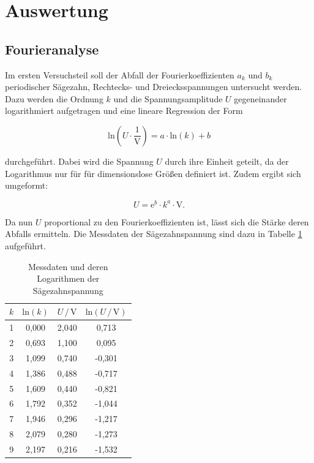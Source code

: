 \section{Auswertung}
\label{sec:Auswertung}

\subsection{Fourieranalyse}

Im ersten Versuchsteil soll der Abfall der Fourierkoeffizienten $a_k$ und $b_k$
periodischer Sägezahn, Rechtecks- und Dreiecksspannungen untersucht werden.
Dazu werden die Ordnung $k$ und die Spannungsamplitude $U$ gegeneinander
logarithmiert aufgetragen und eine lineare Regression der Form

\begin{equation}
    \text{ln} \left(U \cdot \frac{1}{\si{\volt}} \right) = a \cdot \text{ln}(k) + b
\end{equation}

durchgeführt.
Dabei wird die Spannung $U$ durch ihre Einheit geteilt, da der Logarithmus nur für
für dimensionslose Größen definiert ist. Zudem ergibt sich umgeformt:

\begin{equation}
    U = \text{e}^b \cdot k^a \cdot \si{\volt}.
    \label{eqn:Spannung}
\end{equation}

Da nun $U$ proportional zu den Fourierkoeffizienten ist, lässt sich die
Stärke deren Abfalls ermitteln.
Die Messdaten der Sägezahnspannung sind dazu in Tabelle \ref{tab:Messdaten1} aufgeführt. 

\begin{table}[H]
    \centering
    \caption{Messdaten und deren Logarithmen der Sägezahnspannung}
    \label{tab:Messdaten1}
    \begin{tabular}{c c c c}
    \toprule
    $k$ & $\text{ln} (k)$ & $U \,/\, \si{\volt}$ & $\text{ln}(U \,/\, \si{\volt})$ \\
    \midrule
    1 & 0,000 & 2,040 &  0,713 \\
    2 & 0,693 & 1,100 &  0,095 \\
    3 & 1,099 & 0,740 & -0,301 \\
    4 & 1,386 & 0,488 & -0,717 \\
    5 & 1,609 & 0,440 & -0,821 \\
    6 & 1,792 & 0,352 & -1,044 \\
    7 & 1,946 & 0,296 & -1,217 \\
    8 & 2,079 & 0,280 & -1,273 \\
    9 & 2,197 & 0,216 & -1,532 \\
    \bottomrule
    \end{tabular}
\end{table} 

